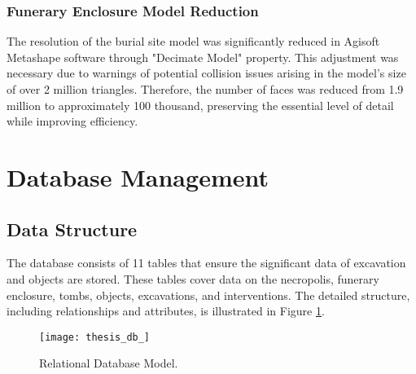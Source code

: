 \subsubsection{Funerary Enclosure Model Reduction}
The resolution of the burial site model was significantly reduced in Agisoft Metashape software through "Decimate Model" property.
This adjustment was necessary due to warnings of potential collision issues arising in the model's size of over 2 million triangles. 
Therefore, the number of faces was reduced from 1.9 million to approximately 100 thousand, preserving the essential level of detail while improving efficiency.


\section{Database Management}
\subsection{Data Structure}

The database consists of 11 tables that ensure the significant data of excavation and objects are stored. %
These tables cover data on the necropolis, funerary enclosure, tombs, objects, excavations, and interventions.
The detailed structure, including relationships and attributes, is illustrated in Figure \ref{fig:database}.

\begin{figure}[h!]
    \centering
    \texttt{[image: thesis\_db\_]}
    \caption{Relational Database Model.} 
    \label{fig:database}
\end{figure}


